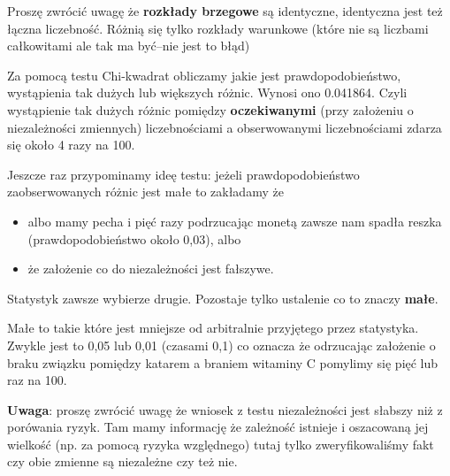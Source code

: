 \documentclass[
  openany]{book}
\begin{document}
\begin{example}
Proszę
zwrócić uwagę że \textbf{rozkłady brzegowe} są identyczne, identyczna
jest też łączna liczebność. Różnią się tylko rozkłady warunkowe (które nie są
liczbami całkowitami ale tak ma być--nie jest to błąd)

Za pomocą testu Chi-kwadrat obliczamy jakie jest prawdopodobieństwo, wystąpienia
tak dużych lub większych różnic. Wynosi ono 0.041864.
Czyli wystąpienie tak dużych różnic
pomiędzy \textbf{oczekiwanymi} (przy założeniu o niezależności zmiennych)
liczebnościami
a obserwowanymi liczebnościami zdarza się około 4 razy na 100.
\end{example}

Jeszcze raz przypominamy ideę testu: jeżeli prawdopodobieństwo zaobserwowanych
różnic jest małe to zakładamy że

\begin{itemize}
\item
  albo mamy pecha i pięć razy podrzucając monetą zawsze nam spadła
  reszka (prawdopodobieństwo około 0,03), albo
\item
  że założenie co do niezależności jest fałszywe.
\end{itemize}

Statystyk zawsze wybierze
drugie. Pozostaje tylko ustalenie co to znaczy \textbf{małe}.

Małe to takie które jest mniejsze od arbitralnie przyjętego
przez statystyka. Zwykle jest to 0,05 lub 0,01 (czasami 0,1)
co oznacza że odrzucając założenie o braku związku pomiędzy
katarem a braniem witaminy C pomylimy się pięć lub raz na 100.

\textbf{Uwaga}: proszę zwrócić uwagę że wniosek z testu niezależności jest
słabszy niż z porówania ryzyk. Tam mamy informację że zależność istnieje
i oszacowaną jej wielkość (np. za pomocą ryzyka względnego) tutaj tylko
zweryfikowaliśmy fakt czy obie zmienne są niezależne czy też nie.
\end{document}
